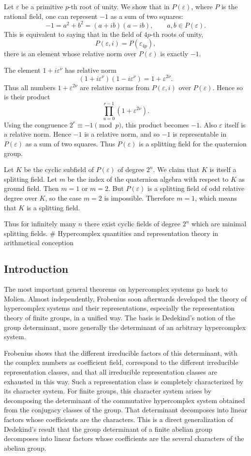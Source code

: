 \documentclass[11pt]{article}
\begin{document}
Let \(\varepsilon\) be a primitive \(p\)-th root of unity. We show that
in \(P(\varepsilon)\), where \(P\) is the rational field, one can
represent \(-1\) as a sum of two squares: \[
  -1=a^2+b^2=(a+ib)(a-ib),
  \qquad a,b\in P(\varepsilon).
\] This is equivalent to saying that in the field of \(4p\)-th roots of
unity, \[
  P(\varepsilon,i)=P(\varepsilon_{4p}),
\] there is an element whose relative norm over \(P(\varepsilon)\) is
exactly \(-1\).

The element \(1+i\varepsilon^{\nu}\) has relative norm \[
  (1+i\varepsilon^{\nu})(1-i\varepsilon^{\nu})
  =1+
\varepsilon^{2\nu}.
\] Thus all numbers \(1+
\varepsilon^{2\nu}\) are relative norms from \(P(\varepsilon,i)\) over
\(P(\varepsilon)\). Hence so is their product \[
  \prod_{
u=0}^{r-1}(1+
\varepsilon^{2\nu}).
\] Using the congruence \(2^r\equiv-1\pmod p\), this product becomes
\(-1\). Also \(\varepsilon\) itself is a relative norm. Hence \(-1\) is
a relative norm, and so \(-1\) is representable in \(P(\varepsilon)\) as
a sum of two squares. Thus \(P(\varepsilon)\) is a splitting field for
the quaternion group.

Let \(K\) be the cyclic subfield of \(P(\varepsilon)\) of degree
\(2^n\). We claim that \(K\) is itself a splitting field. Let \(m\) be
the index of the quaternion algebra with respect to \(K\) as ground
field. Then \(m=1\) or \(m=2\). But \(P(\varepsilon)\) is a splitting
field of odd relative degree over \(K\), so the case \(m=2\) is
impossible. Therefore \(m=1\), which means that \(K\) is a splitting
field.

Thus for infinitely many \(n\) there exist cyclic fields of degree
\(2^n\) which are minimal splitting fields. \# Hypercomplex quantities
and representation theory in arithmetical conception

\subsection{Introduction}\label{introduction}

The most important general theorems on hypercomplex systems go back to
Molien. Almost independently, Frobenius soon afterwards developed the
theory of hypercomplex systems and their representations, especially the
representation theory of finite groups, in a unified way. The basis is
Dedekind's notion of the group determinant, more generally the
determinant of an arbitrary hypercomplex system.

Frobenius shows that the different irreducible factors of this
determinant, with the complex numbers as coefficient field, correspond
to the different irreducible representation classes, and that all
irreducible representation classes are exhausted in this way. Such a
representation class is completely characterized by its character
system. For finite groups, this character system arises by decomposing
the determinant of the commutative hypercomplex system obtained from the
conjugacy classes of the group. That determinant decomposes into linear
factors whose coefficients are the characters. This is a direct
generalization of Dedekind's result that the group determinant of a
finite abelian group decomposes into linear factors whose coefficients
are the several characters of the abelian group.
\end{document}
